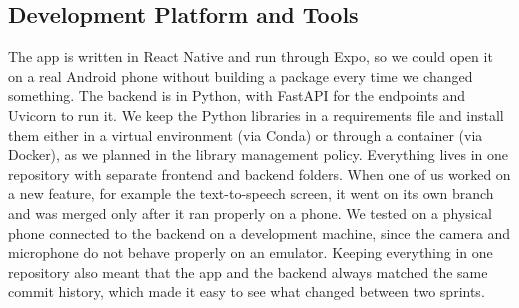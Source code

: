 \documentclass{FastFyp}
\begin{document}
\subsection{Development Platform and Tools}
The app is written in React Native and run through Expo, so we could open it on a real Android phone without building a package every time we changed something. The backend is in Python, with FastAPI for the endpoints and Uvicorn to run it. We keep the Python libraries in a requirements file and install them either in a virtual environment (via Conda) or through a container (via Docker), as we planned in the library management policy. Everything lives in one repository with separate frontend and backend folders. When one of us worked on a new feature, for example the text-to-speech screen, it went on its own branch and was merged only after it ran properly on a phone. We tested on a physical phone connected to the backend on a development machine, since the camera and microphone do not behave properly on an emulator. Keeping everything in one repository also meant that the app and the backend always matched the same commit history, which made it easy to see what changed between two sprints.
\end{document}
